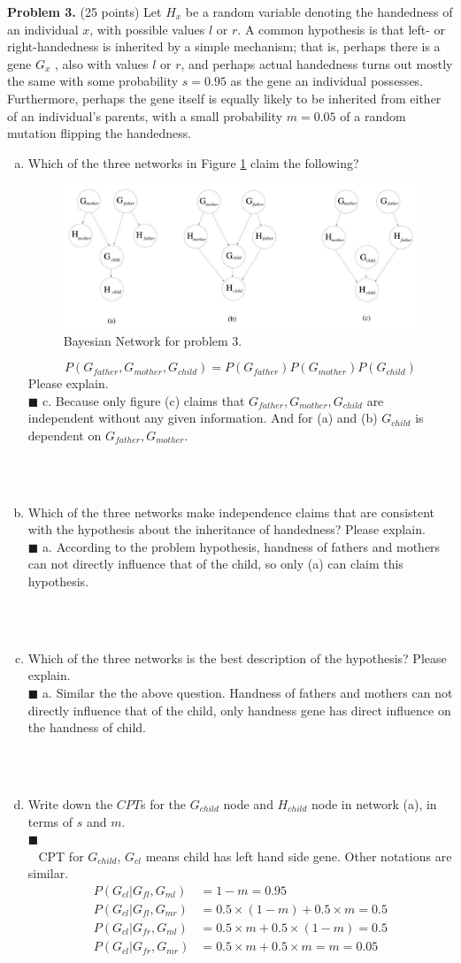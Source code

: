 \documentclass{article}
\newcommand{\solution}[1]{~\\ $\blacksquare$ \sffamily\upshape\selectfont #1
\normalfont ~\\~ }
\begin{document}
\textbf{Problem 3.} (25 points) Let $H_x$ be a random variable
denoting the handedness of an individual $x$, with possible values $l$
or $r$. A common hypothesis is that left- or right-handedness is
inherited by a simple mechanism; that is, perhaps there is a gene
$G_x$ , also with values $l$ or $r$, and perhaps actual handedness
turns out mostly the same with some probability $s = 0.95$ as the gene
an individual possesses. Furthermore, perhaps the gene itself is
equally likely to be inherited from either of an individual’s parents,
with a small probability $m = 0.05$ of a random mutation flipping the
handedness.
\begin{enumerate}[(a)]
\item Which of the three networks in Figure \ref{fig:final_3.1} claim
  the following?
  \begin{figure}[ht]
    \centering
    \includegraphics[width=.8\textwidth]{AI-FINAL-3_1.pdf}
    \caption{Bayesian Network for problem 3.}\label{fig:final_3.1}
  \end{figure}
  \[ P(G_{father}, G_{mother}, G_{child}) =
  P(G_{father})P(G_{mother})P(G_{child}) \]
  Please explain.
\solution{
  c. Because only figure (c) claims that $G_{father}, G_{mother},
  G_{child}$ are independent without any given information. And for
  (a) and (b) $G_{child}$ is dependent on $G_{father}, G_{mother}$. 
}
\item Which of the three networks make independence claims that are
  consistent with the hypothesis about the inheritance of handedness?
  Please explain.
\solution{
  a. According to the problem hypothesis, handness of fathers and
  mothers can not directly influence that of the child, so only (a)
  can claim this hypothesis. 
}
\item Which of the three networks is the best description of the
  hypothesis? Please explain.
\solution{
  a. Similar the the above question. Handness of fathers and
  mothers can not directly influence that of the child, only handness
  gene has direct influence on the handness of child.
}
\item Write down the $CPT$s for the $G_{child}$ node and $H_{child}$ node in
  network (a), in terms of $s$ and $m$.
  \solution{}
    CPT for $G_{child}$, $G_{cl}$ means child has left hand side
    gene. Other notations are similar. 
    \begin{align*}
      P(G_{cl}|G_{fl},G_{ml}) & = 1-m = 0.95\\
      P(G_{cl}|G_{fl},G_{mr}) & = 0.5\times (1-m) + 0.5\times m = 0.5 \\ 
      P(G_{cl}|G_{fr},G_{ml}) & = 0.5\times m + 0.5\times (1-m) = 0.5 \\ 
      P(G_{cl}|G_{fr},G_{mr}) & = 0.5\times m + 0.5\times m = m = 0.05 
    \end{align*}


\end{enumerate}
\end{document}
